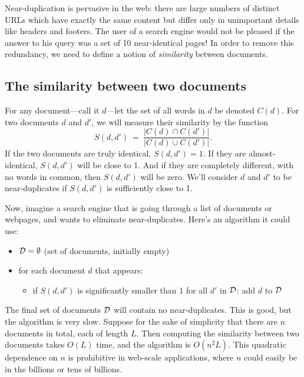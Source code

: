 \documentclass{report}
\theoremstyle{plain}
\theoremstyle{definition}
\begin{document}
\lecturer{}
\scribe{}

\maketitle


Near-duplication is pervasive in the web: there are large numbers of
distinct URLs which have exactly the same content but differ only in
unimportant details like headers and footers. The user of a search
engine would not be pleased if the answer to his query was a set of 10
near-identical pages! In order to remove this redundancy, we need to
define a notion of {\it similarity} between documents.

\subsection{The similarity between two documents}

For any document---call it $d$---let the set of all words in $d$ be
denoted $C(d)$. For two documents $d$ and $d'$, we will measure their
similarity by the function
$$ S(d,d') \ = \ \frac{|C(d) \cap C(d')|}{|C(d) \cup C(d')|} .$$
If the two documents are truly identical, $S(d,d') = 1$. If they are almost-identical, $S(d,d')$ will
be close to 1. And if they are completely different, with no words in common, then $S(d,d')$ will be
zero. We'll consider $d$ and $d'$ to be near-duplicates if $S(d,d')$ is sufficiently close to 1.

Now, imagine a search engine that is going through a list of documents or webpages, and wants to 
eliminate near-duplicates. Here's an algorithm it could use:
\begin{itemize}
\item ${\cal D} = \emptyset$ (set of documents, initially empty)
\item for each document $d$ that appears:
\begin{itemize}
\item if $S(d,d')$ is significantly smaller than 1 for all $d'$ in ${\cal D}$: add $d$ to ${\cal D}$
\end{itemize}
\end{itemize}
The final set of documents ${\cal D}$ will contain no near-duplicates. This is good, but the
algorithm is very slow. Suppose for the sake of simplicity that there are $n$ documents in total,
each of length $L$. Then computing the similarity between two documents takes $O(L)$ time, and
the algorithm is $O(n^2L)$. This quadratic dependence on $n$ is prohibitive in web-scale applications,
where $n$ could easily be in the billions or tens of billions.
\end{document}
